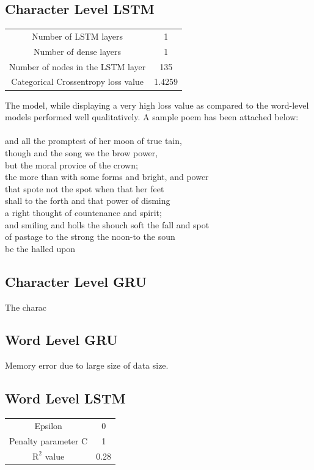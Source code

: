 \documentclass[15pt]{article}
\begin{document}
\subsection{Character Level LSTM}
\begin{center}
\begin{tabular}{c c}
Number of LSTM layers & 1 \\
Number of dense layers & 1 \\
Number of nodes in the LSTM layer  & 135 \\
Categorical Crossentropy loss value & 1.4259 \\
\end{tabular}
\end{center}
The model, while displaying a very high loss value as compared to the word-level models performed well qualitatively. A sample poem has been attached below:\\
\\
and all the promptest of her moon of true tain,\\
though and the song we the brow power,\\
but the moral provice of the crown;\\
the more than with some forms and bright, and power\\
that spote not the spot when that her feet\\
shall to the forth and that power of disming\\
a right thought of countenance and spirit;\\
and smiling and holls the shouch soft the fall and spot\\
of pastage to the strong the noon-to the soun\\
be the halled upon\\


\subsection{Character Level GRU}
The charac

\subsection{Word Level GRU}
Memory error due to large size of data size.

\subsection{Word Level LSTM}
\begin{center}
\begin{tabular}{c c}
Epsilon & 0 \\
Penalty parameter C & 1 \\
$\text{R}^{2}$ value & 0.28 \\
\end{tabular}
\end{center}
\end{document}
